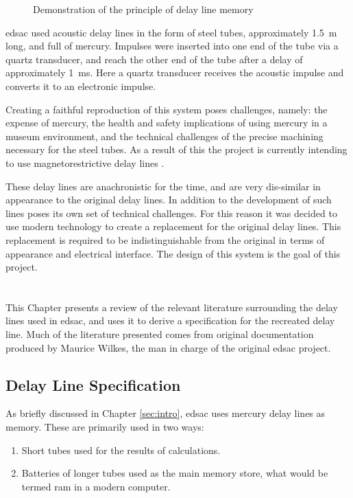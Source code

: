 \begin{figure}[ht]
	\centering
	\dummyfigure
	\caption{Demonstration of the principle of delay line memory}
	\label{fig:delay-line-principle}
\end{figure}

\Gls{edsac} used acoustic delay lines in the form of steel tubes, approximately \SI{1.5}{\metre} long, and full of mercury. Impulses were inserted into one end of the tube via a quartz transducer, and reach the other end of the tube after a delay of approximately \SI{1}{\milli\second}. Here a quartz transducer receives the acoustic impulse and converts it to an electronic impulse.

Creating a faithful reproduction of this system poses challenges, namely: the expense of mercury, the health and safety implications of using mercury in a museum environment, and the technical challenges of the precise machining necessary for the steel tubes. As a result of this the project is currently intending to use magnetorestrictive delay lines \cite{ward2011}.

These delay lines are anachronistic for the time, and are very dis-similar in appearance to the original delay lines. In addition to the development of such lines poses its own set of technical challenges. For this reason it was decided to use modern technology to create a replacement for the original delay lines. This replacement is required to be indistinguishable from the original in terms of appearance and electrical interface. The design of this system is the goal of this project.

\chapter{} \label{sec:tech-rev}
This Chapter presents a review of the relevant literature surrounding the delay lines used in \gls{edsac}, and uses it to derive a specification for the recreated delay line. Much of the literature presented comes from original documentation produced by Maurice Wilkes, the man in charge of the original \gls{edsac} project.

\section{ Delay Line Specification}
As briefly discussed in Chapter \ref{sec:intro}, \gls{edsac} uses mercury delay lines as memory. These are primarily used in two ways:
\begin{enumerate}
	\item Short tubes used for the results of calculations.
	\item Batteries of longer tubes used as the main memory store, what would be termed \gls{ram} in a modern computer.
\end{enumerate}

